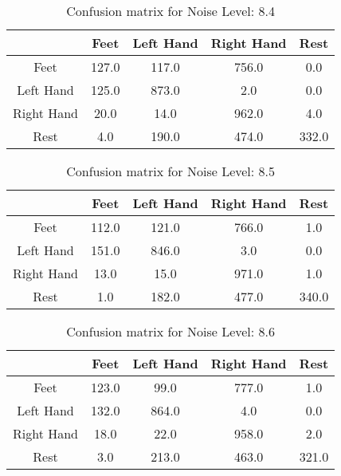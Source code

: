 \begin{table}[!htbp]
    \centering
    \begin{tabular}{|c||c|c|c|c|}
        \hline
		 & Feet & Left Hand & Right Hand & Rest \\
        \hline
        \hline
        Feet & 127.0 & 117.0 & 756.0 & 0.0 \\
        \hline
        Left Hand & 125.0 & 873.0 & 2.0 & 0.0 \\
        \hline
        Right Hand & 20.0 & 14.0 & 962.0 & 4.0 \\
        \hline
        Rest & 4.0 & 190.0 & 474.0 & 332.0 \\
        \hline
    \end{tabular}
    \caption{Confusion matrix for Noise Level: 8.4}
\end{table}

\begin{table}[!htbp]
    \centering
    \begin{tabular}{|c||c|c|c|c|}
        \hline
		 & Feet & Left Hand & Right Hand & Rest \\
        \hline
        \hline
        Feet & 112.0 & 121.0 & 766.0 & 1.0 \\
        \hline
        Left Hand & 151.0 & 846.0 & 3.0 & 0.0 \\
        \hline
        Right Hand & 13.0 & 15.0 & 971.0 & 1.0 \\
        \hline
        Rest & 1.0 & 182.0 & 477.0 & 340.0 \\
        \hline
    \end{tabular}
    \caption{Confusion matrix for Noise Level: 8.5}
\end{table}

\begin{table}[!htbp]
    \centering
    \begin{tabular}{|c||c|c|c|c|}
        \hline
		 & Feet & Left Hand & Right Hand & Rest \\
        \hline
        \hline
        Feet & 123.0 & 99.0 & 777.0 & 1.0 \\
        \hline
        Left Hand & 132.0 & 864.0 & 4.0 & 0.0 \\
        \hline
        Right Hand & 18.0 & 22.0 & 958.0 & 2.0 \\
        \hline
        Rest & 3.0 & 213.0 & 463.0 & 321.0 \\
        \hline
    \end{tabular}
    \caption{Confusion matrix for Noise Level: 8.6}
\end{table}

